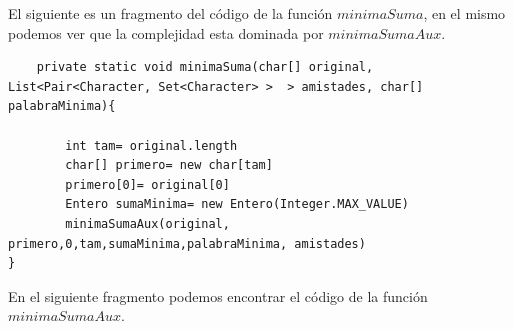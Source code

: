 


El siguiente es un fragmento del código de la función $ minimaSuma$, en el mismo podemos ver que la complejidad esta dominada por $ minimaSumaAux $.
\begin{lstlisting}
	private static void minimaSuma(char[] original, List<Pair<Character, Set<Character> >  > amistades, char[] palabraMinima){
		
		int tam= original.length	
		char[] primero= new char[tam]
		primero[0]= original[0]
		Entero sumaMinima= new Entero(Integer.MAX_VALUE)
		minimaSumaAux(original, primero,0,tam,sumaMinima,palabraMinima, amistades)
}
\end{lstlisting}

En el siguiente fragmento podemos encontrar el código de la función $ minimaSumaAux $.

